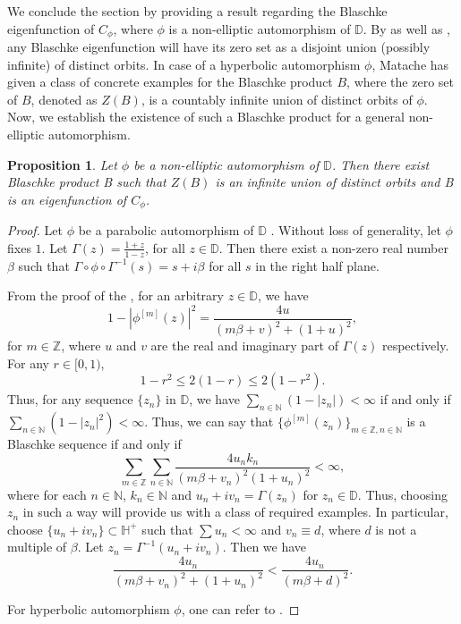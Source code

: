 \documentclass[12pt, reqno]{amsart}
\newtheorem{proposition}[theorem]{Proposition}
\theoremstyle{definition}
\numberwithin{equation}{section}
\begin{document}
	  







		
		We conclude the section by providing a result regarding the Blaschke eigenfunction of $C_\phi$, where $\phi$ is a non-elliptic automorphism of $\mathbb{D}$.
	By \cite[Theorem 3.5]{matacheeigen} as well as \cite[Theorem 7.1]{modelsubspace}, any Blaschke eigenfunction will have its zero set as a disjoint union (possibly infinite)  of distinct orbits. In case of a hyperbolic automorphism $\phi$, Matache \cite[Remark 2]{matacheeigen} has given a class of  concrete examples for the Blaschke product  $B$, where  the zero set of $B$, denoted as $Z(B)$, is a countably infinite union of distinct orbits of $\phi$. Now, we establish the existence of such a Blaschke product for a general non-elliptic automorphism.
		\begin{proposition}
			Let $\phi$ be a non-elliptic automorphism of $\mathbb{D}$.  Then there exist Blaschke product B such that $Z(B)$ is an infinite union of distinct orbits and B is an
			eigenfunction of $C_\phi$.
		\end{proposition}
		\begin{proof} 
			Let $\phi$ be a parabolic automorphism of $\mathbb{D}$ . Without loss of generality, let $\phi$ fixes $1$. Let $\Gamma(z)=\frac{1+z}{1-z}$, for all $z \in \mathbb{D}$. Then there exist a non-zero real number $\beta$ such that $\Gamma \circ \phi \circ \Gamma^{-1}(s)=s+i\beta$ for all $s$ in the right half plane. 
			
			From the proof of the \cite[Theorem 4.1]{buerlingtype}, for an arbitrary $z \in \mathbb{D}$, we have 
			$$1-|\phi^{[m]}(z)|^2=\dfrac{4 u}{(m\beta+v)^2+(1+u)^2},$$
			for $m \in \mathbb{Z}$, where 
			$u$ and $v$ are the real and imaginary part of $\Gamma(z)$ respectively. For any $r \in [0,1)$, 
			$$1-r^2\leq 2(1-r)\leq 2(1-r^2).$$ Thus, for any sequence $\{z_n\}$ in $\mathbb{D}$, we have $\sum\limits_{n\in \mathbb{N}}(1-|z_n|)<\infty$ if and only if $\sum\limits_{n\in \mathbb{N}}(1-|z_n|^2)<\infty$. Thus, we can say that $\{\phi^{[m]}(z_n)\}_{m\in \mathbb{Z}, n \in \mathbb{N}}$ is a Blaschke sequence if and only if $$\sum\limits_{m\in \mathbb{Z}}\sum\limits_{n\in \mathbb{N}}\dfrac{4 u_n k_n}{(m\beta+v_n)^2 (1+u_n)^2}<\infty,$$
			where for each $n \in \mathbb{N}$, $k_n\in  \mathbb{N}$ and $u_n +iv_n=\Gamma(z_n)$ for $z_n\in \mathbb{D}$. Thus, choosing $z_n$ in such a way will provide us with a class of required examples. In particular, 
			choose $\{u_n+iv_n\}\subset\mathbb{H}^+$ such that $\sum u_n<\infty$ and $v_n\equiv d$, where $d$ is not a multiple of $\beta$. Let $z_n=\Gamma^{-1}(u_n+iv_n)$. Then we have
			$$\dfrac{4 u_n}{(m\beta+v_n)^2+(1+u_n)^2}<\dfrac{4 u_n}{(m\beta+d)^2}.$$ 
			
			For hyperbolic automorphism $\phi$, one can refer to 
			 \cite[Remark 2]{matacheeigen}.
		\end{proof}
		
\end{document}
